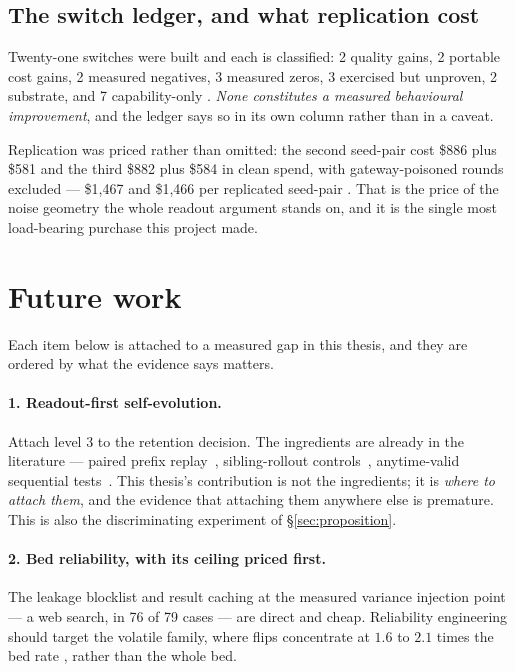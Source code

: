 \subsection*{The switch ledger, and what replication cost}

Twenty-one switches were built and each is classified: 2 quality gains, 2
portable cost gains, 2 measured negatives, 3 measured zeros, 3 exercised
but unproven, 2 substrate, and 7 capability-only . \emph{None
constitutes a measured behavioural improvement}, and the ledger says so in
its own column rather than in a caveat.

Replication was priced rather than omitted: the second seed-pair cost
\$886 plus \$581 and the third \$882 plus \$584 in clean spend, with
gateway-poisoned rounds excluded --- \$1{,}467 and \$1{,}466 per replicated
seed-pair . That is the price of the noise geometry the whole
readout argument stands on, and it is the single most load-bearing purchase
this project made.

\section{Future work}
\label{sec:future}

Each item below is attached to a measured gap in this thesis, and they are
ordered by what the evidence says matters.

\paragraph{1. Readout-first self-evolution.} Attach level 3 to the
retention decision. The ingredients are already in the literature ---
paired prefix replay~\cite{shepherd,car}, sibling-rollout
controls~\cite{craft}, anytime-valid sequential tests~\cite{pace}. This
thesis's contribution is not the ingredients; it is \emph{where to attach
them}, and the evidence that attaching them anywhere else is premature.
This is also the discriminating experiment of \S\ref{sec:proposition}.

\paragraph{2. Bed reliability, with its ceiling priced first.} The leakage
blocklist and result caching at the measured variance injection point ---
a web search, in 76 of 79 cases  --- are direct and cheap. Reliability
engineering should target the volatile family, where flips concentrate at
$1.6$ to $2.1$ times the bed rate , rather than the whole
bed.


